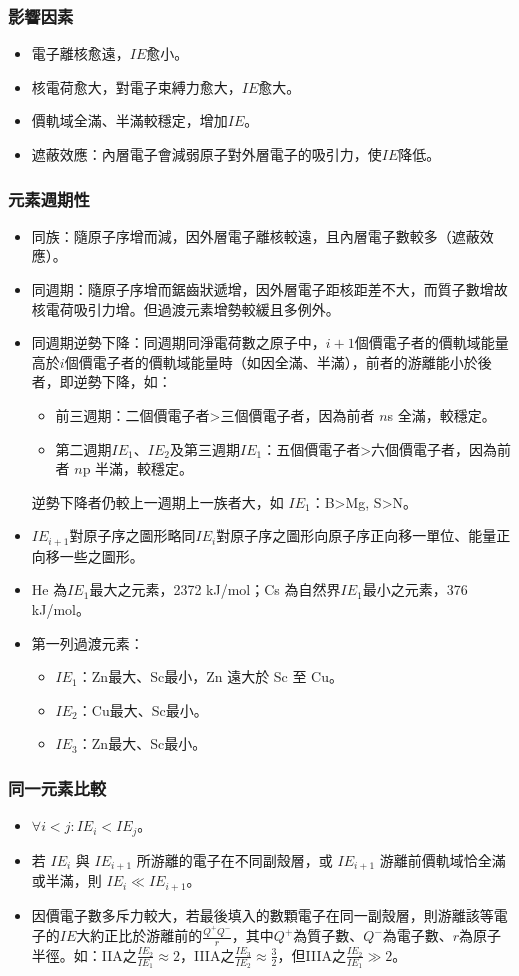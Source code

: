 \documentclass[a4paper,12pt]{report}
\begin{document}
\subsubsection{影響因素}
\begin{itemize}
\item 電子離核愈遠，$IE$愈小。
\item 核電荷愈大，對電子束縛力愈大，$IE$愈大。
\item 價軌域全滿、半滿較穩定，增加$IE$。 
\item 遮蔽效應：內層電子會減弱原子對外層電子的吸引力，使$IE$降低。
\end{itemize}
\subsubsection{元素週期性}
\begin{itemize}
\item 同族：隨原子序增而減，因外層電子離核較遠，且內層電子數較多（遮蔽效應）。
\item 同週期：隨原子序增而鋸齒狀遞增，因外層電子距核距差不大，而質子數增故核電荷吸引力增。但過渡元素增勢較緩且多例外。
\item 同週期逆勢下降：同週期同淨電荷數之原子中，$i+1$個價電子者的價軌域能量高於$i$個價電子者的價軌域能量時（如因全滿、半滿），前者的游離能小於後者，即逆勢下降，如：
\begin{itemize}
\item 前三週期：二個價電子者>三個價電子者，因為前者 $n$s 全滿，較穩定。
\item 第二週期$IE_1$、$IE_2$及第三週期$IE_1$：五個價電子者>六個價電子者，因為前者 $n$p 半滿，較穩定。
\end{itemize}
逆勢下降者仍較上一週期上一族者大，如 $IE_1$：B>Mg, S>N。
\item $IE_{i+1}$對原子序之圖形略同$IE_i$對原子序之圖形向原子序正向移一單位、能量正向移一些之圖形。
\item He 為$IE_1$最大之元素，2372 kJ/mol；Cs 為自然界$IE_1$最小之元素，376 kJ/mol。
\item 第一列過渡元素：
\begin{itemize}
\item $IE_1$：Zn最大、Sc最小，Zn 遠大於 Sc 至 Cu。
\item $IE_2$：Cu最大、Sc最小。
\item $IE_3$：Zn最大、Sc最小。
\end{itemize}
\end{itemize}
\subsubsection{同一元素比較}
\begin{itemize}
\item $\forall i < j\colon IE_i < IE_j$。
\item 若 $IE_i$ 與 $IE_{i+1}$ 所游離的電子在不同副殼層，或 $IE_{i+1}$ 游離前價軌域恰全滿或半滿，則 $IE_i\ll IE_{i+1}$。
\item 因價電子數多斥力較大，若最後填入的數顆電子在同一副殼層，則游離該等電子的$IE$大約正比於游離前的$\frac{Q^+Q^-}{r}$，其中$Q^+$為質子數、$Q^-$為電子數、$r$為原子半徑。如：IIA之$\frac{IE_2}{IE_1}\approx 2$，IIIA之$\frac{IE_3}{IE_2}\approx\frac{3}{2}$，但IIIA之$\frac{IE_2}{IE_1}\gg 2$。
\end{itemize}
\end{document}
